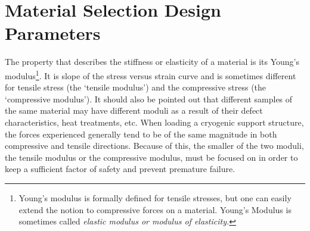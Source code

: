 \documentclass[final]{svjour2}
\begin{document}
\section{Material Selection Design Parameters}

The property that describes the stiffness or elasticity of a material is its Young's modulus\footnote{Young's modulus is formally defined for tensile stresses, but one can easily extend the notion to compressive forces on a material. Young's Modulus is sometimes called \em{elastic modulus} or \em{modulus of elasticity}.}. It is slope of the stress versus strain curve and is sometimes different for tensile stress (the `tensile modulus') and the compressive stress (the `compressive modulus'). It should also be pointed out that different samples of the same material may have different moduli as a result of their defect characteristics, heat treatments, etc. When loading a cryogenic support structure, the forces experienced generally tend to be of the same magnitude in both compressive and tensile directions.  Because of this, the smaller of the two moduli, the tensile modulus or the compressive modulus, must be focused on in order to keep a sufficient factor of safety and prevent premature failure.
\end{document}
